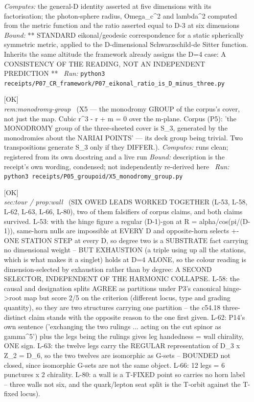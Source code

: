 \begin{description}
\emph{Computes:} the general-D identity asserted at five dimensions with its factorisation; the photon-sphere radius, Omega\_c\textasciicircum{}2 and lambda\textasciicircum{}2 computed from the metric function and the ratio asserted equal to D-3 at six dimensions
 \emph{Bound:} ** STANDARD eikonal/geodesic correspondence for a static spherically symmetric metric, applied to the D-dimensional Schwarzschild-de Sitter function. Inherits the same altitude the framework already assigns the D=4 case: A CONSISTENCY OF THE READING, NOT AN INDEPENDENT PREDICTION **
\ \emph{Run:} \texttt{python3 receipts/P07\_CR\_framework/P07\_eikonal\_ratio\_is\_D\_minus\_three.py}
\item[\label{rcpt:X5_monodromy_group}\texttt{X5\_monodromy\_group}]\hfill\textsf{[OK]}\\
\textit{rem:monodromy-group} \ (X5 --- the monodromy GROUP of the corpus's cover, not just the map. Cubic r\textasciicircum{}3 - r + m = 0 over the m-plane. Corpus (P5): 'the MONODROMY group of the three-sheeted cover is S\_3, generated by the monodromies about the NARIAI POINTS' --- its deck group being trivial. Two transpositions generate S\_3 only if they DIFFER.). 
\emph{Computes:} runs clean; registered from its own docstring and a live run
 \emph{Bound:} description is the receipt's own wording, condensed; not independently re-derived here
\ \emph{Run:} \texttt{python3 receipts/P05\_groupoid/X5\_monodromy\_group.py}
\item[\label{rcpt:P03_batch1_cheap_owed}\texttt{P03\_batch1\_cheap\_owed}]\hfill\textsf{[OK]}\\
\textit{sec:tour / prop:wall} \ (SIX OWED LEADS WORKED TOGETHER (L-53, L-58, L-62, L-63, L-66, L-80), two of them falsifiers of corpus claims, and both claims survived. L-53: with the hinge figure a regular (D-1)-gon at R = alpha/cos(pi/(D-1)), same-horn nulls are impossible at EVERY D and opposite-horn selects +-ONE STATION STEP at every D, so degree two is a SUBSTRATE fact carrying no dimensional weight -- BUT EXHAUSTION (a triple using up all the stations, which is what makes it a singlet) holds at D=4 ALONE, so the colour reading is dimension-selected by exhaustion rather than by degree: A SECOND SELECTOR, INDEPENDENT OF THE HARMONIC COLLAPSE. L-58: the causal and designation splits AGREE as partitions under P3's canonical hinge->root map but score 2/5 on the criterion (different locus, type and grading quantity), so they are two structures carrying one partition -- the c54.18 three-distinct claim stands with the opposite reason to the one first given. L-62: P14's own sentence ('exchanging the two rulings ... acting on the cut spinor as gamma\textasciicircum{}5') plus the legs being the rulings gives leg handedness = wall chirality, ONE sign. L-63: the twelve legs carry the REGULAR representation of D\_3 x Z\_2 = D\_6, so the two twelves are isomorphic as G-sets -- BOUNDED not closed, since isomorphic G-sets are not the same object. L-66: 12 legs = 6 punctures x 2 chirality. L-80: a wall is a T-FIXED point so carries no horn label -- three walls not six, and the quark/lepton seat split is the T-orbit against the T-fixed locus). 

\end{description}

